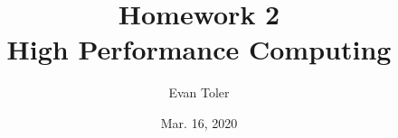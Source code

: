 



\author{Evan Toler}
\date{Mar. 16, 2020}
\title{Homework 2 \\ High Performance Computing}


\maketitle






